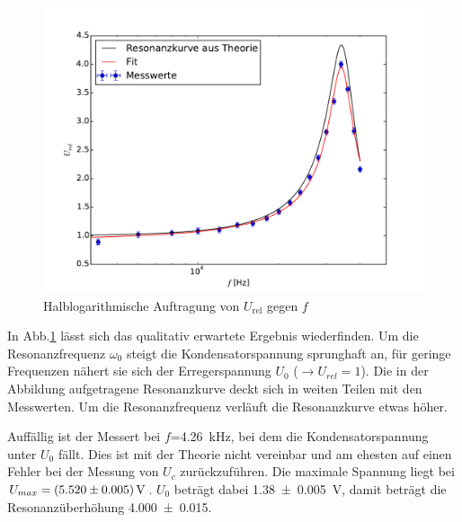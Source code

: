 \begin{figure}[H]
  \centering
  \includegraphics[width=\textwidth]{5cfit.pdf}
  \caption{Halblogarithmische Auftragung von $U_\text{rel}$ gegen $f$}
  \label{fig:5cergebnis}
\end{figure}
In Abb.\ref{fig:5cergebnis} lässt sich das qualitativ erwartete Ergebnis
wiederfinden. Um die Resonanzfrequenz $\omega_0$ steigt die Kondensatorspannung
sprunghaft an, für geringe Frequenzen nähert sie sich der Erregerspannung $U_0$
($\rightarrow U_{rel}=1$). Die in der Abbildung aufgetragene Resonanzkurve
deckt sich in weiten Teilen mit den Messwerten. Um die Resonanzfrequenz verläuft
die Resonanzkurve etwas höher.

Auffällig ist der Messert bei $f$=\SI{4.26}{\kilo\hertz},
bei dem die Kondensatorspannung unter
$U_0$ fällt. Dies ist mit der Theorie nicht vereinbar und am ehesten auf einen
Fehler bei der Messung von $U_c$ zurückzuführen. Die maximale Spannung liegt
bei $U_{max} = \SI{5.52 +- 0.005}{\volt}$. $U_0$ beträgt dabei \SI{1.38 +- 0.005}
{\volt}, damit beträgt die Resonanzüberhöhung \num{4.000 +- 0.015}.

